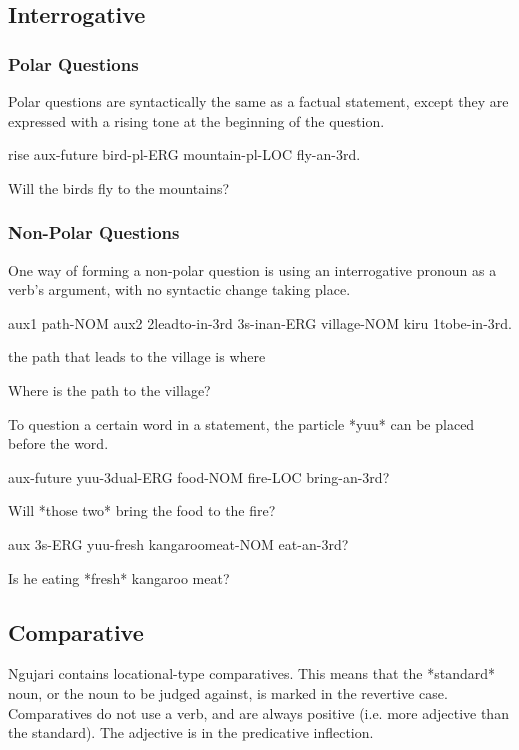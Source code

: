 \subsection{Interrogative}

\subsubsection{Polar Questions}

Polar questions are syntactically the same as a factual statement, except they
are expressed with a rising tone at the beginning of the question.

rise aux-future bird-pl-ERG mountain-pl-LOC fly-an-3rd.

Will the birds fly to the mountains?

\subsubsection{Non-Polar Questions}

One way of forming a non-polar question is using an interrogative pronoun as a
verb's argument, with no syntactic change taking place.

aux1 path-NOM aux2 2leadto-in-3rd 3s-inan-ERG village-NOM kiru 1tobe-in-3rd.

the path that leads to the village is where

Where is the path to the village?

To question a certain word in a statement, the particle *yuu* can be placed
before the word.

aux-future yuu-3dual-ERG food-NOM fire-LOC bring-an-3rd?

Will *those two* bring the food to the fire?

aux 3s-ERG yuu-fresh kangaroomeat-NOM eat-an-3rd?

Is he eating *fresh* kangaroo meat?

\subsection{Comparative}

Ngujari contains locational-type comparatives. This means that the *standard*
noun, or the noun to be judged against, is marked in the revertive case.
Comparatives do not use a verb, and are always positive (i.e. more adjective
than the standard). The adjective is in the predicative inflection.

